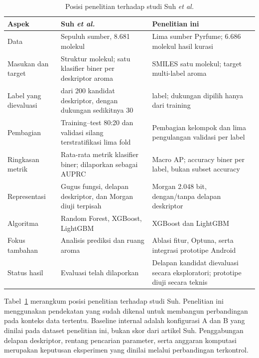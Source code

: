 \begin{table}[htbp]
\centering
\caption{Posisi penelitian terhadap studi Suh \textit{et al.}}
\label{tab:penelitian_terdahulu}
\small
\begin{tabular}{>{\raggedright\arraybackslash}p{}>{\raggedright\arraybackslash}p{}>{\raggedright\arraybackslash}p{}}
\toprule
Aspek & Suh \textit{et al.} \cite{suh2025} & Penelitian ini \\
\midrule
Data & Sepuluh sumber, 8.681 molekul & Lima sumber Pyrfume; 6.686 molekul hasil kurasi \\
Masukan dan target & Struktur molekul; satu klasifier biner per deskriptor aroma & SMILES satu molekul; target multi-label aroma \\
Label yang dievaluasi & 100 dari 200 kandidat deskriptor, dengan dukungan sedikitnya 30 & 109 label; dukungan dipilih hanya dari training \\
Pembagian & Training--test 80:20 dan validasi silang terstratifikasi lima fold & Pembagian kelompok dan lima pengulangan validasi per label \\
Ringkasan metrik & Rata-rata metrik klasifier biner; dilaporkan sebagai AUPRC & Macro AP; accuracy biner per label, bukan subset accuracy \\
Representasi & Gugus fungsi, delapan deskriptor, dan Morgan diuji terpisah & Morgan 2.048 bit, dengan/tanpa delapan deskriptor \\
Algoritma & Random Forest, XGBoost, LightGBM & XGBoost dan LightGBM \\
Fokus tambahan & Analisis prediksi dan ruang aroma & Ablasi fitur, Optuna, serta integrasi prototipe Android \\
Status hasil & Evaluasi telah dilaporkan & Delapan kandidat dievaluasi secara eksploratori; prototipe diuji secara teknis \\
\bottomrule
\end{tabular}
\end{table}

Tabel~\ref{tab:penelitian_terdahulu} merangkum posisi penelitian terhadap studi Suh. Penelitian ini menggunakan pendekatan yang sudah dikenal untuk membangun perbandingan pada konteks data tertentu. Baseline internal adalah konfigurasi A dan B yang dinilai pada dataset penelitian ini, bukan skor dari artikel Suh. Penggabungan delapan deskriptor, rentang pencarian parameter, serta anggaran komputasi merupakan keputusan eksperimen yang dinilai melalui perbandingan terkontrol.

